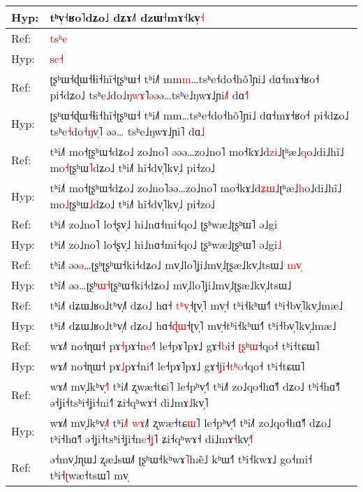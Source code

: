 \documentclass[10pt]{article}
\DeclareRobustCommand{\hl}[1]{{\textcolor{red}{#1}}}
\begin{document}
\begin{longtable}{ll}
Hyp: & tʰv̩˧ʁo˥dʑo˩ dʑɤ˩˥ dzɯ˧mɤ˧kv̩\hl{˧} \\ 
\midrule 
Ref: & \hl{t}s\hl{ʰ}\hl{e} \\ 
Hyp: & s\hl{e}\hl{˧} \\ 
\midrule 
Ref: & ʈʂʰɯ˧ɖɯ˧ɬi˧hĩ˧ʈʂʰɯ˧ tʰi˩˥ mm\hl{m}…tsʰe˧do˧hõ˥ɲi˩ dɑ˧mɤ˧ʁo˧ pi˧dʑo˩ tsʰe\hl{˩}do\hl{˩}ŋ\hl{w}\hl{ɤ}˥\hl{ə}əə…tsʰe˩ŋwɤ˩ɲi\hl{˩}˥ dɑ\hl{˧}\hl{˥} \\ 
Hyp: & ʈʂʰɯ˧ɖɯ˧ɬi˧hĩ˧ʈʂʰɯ˧ tʰi˩˥ mm…tsʰe˧do˧hõ˥ɲi˩ dɑ˧mɤ˧ʁo˧ pi˧dʑo˩ tsʰe\hl{˧}do\hl{˧}ŋ\hl{v}\hl{̩}˥\hl{ }əə…\hl{ }tsʰe˩ŋwɤ˩ɲi˥ dɑ\hl{˩} \\ 
\midrule 
Ref: & tʰi˩˥ mo˧ʈʂʰɯ˧dʑo˩ zo˩no˥\hl{ }\hl{ə}əə…zo˩no˥ mo˧kɤ˩d\hl{z}\hl{i}˩ʈʰæ˩\hl{q}o˩di˩hĩ˩ mo\hl{˧}ʈʂʰɯ\hl{˥}dʑo˩ tʰi˩˥ hĩ˧dv̩˥kv̩˩ pi˧zo˩ \\ 
Hyp: & tʰi˩˥ mo˧ʈʂʰɯ˧dʑo˩ zo˩no˥əə…zo˩no˥ mo˧kɤ˩d\hl{ʑ}\hl{ɯ}˩ʈʰæ˩\hl{h}o˩di˩hĩ˩ mo\hl{˩}ʈʂʰɯ\hl{˩}dʑo˩ tʰi˩˥ hĩ˧dv̩˥kv̩˩ pi˧zo˩ \\ 
\midrule 
Ref: & tʰi˩˥ zo˩no˥ lo˧ʂv̩˩ hi˩nɑ˧mi˧qo˩ ʈʂʰwæ˩ʈʂʰɯ˥ ə˩gi \\ 
Hyp: & tʰi˩˥ zo˩no˥ lo˧ʂv̩˩ hi˩nɑ˧mi˧qo˩ ʈʂʰwæ˩ʈʂʰɯ˥ ə˩gi\hl{˩} \\ 
\midrule 
Ref: & tʰi˩˥ əə\hl{ə}…ʈʂʰʈʂʰɯ˧ki˧dʑo˩ mv̩˩lo˥ʝi˩mv̩˩ʈʂæ˩kv̩˩tsɯ˩\hl{ }\hl{m}\hl{v}\hl{̩} \\ 
Hyp: & tʰi˩˥ əə…ʈʂʰ\hl{ɯ}\hl{˧}ʈʂʰɯ˧ki˧dʑo˩ mv̩˩lo˥ʝi˩mv̩˩ʈʂæ˩kv̩˩tsɯ˩ \\ 
\midrule 
Ref: & tʰi˩˥ dʑɯ˩ʁo˩tʰv̩˩˥ dʑo˩ hɑ˧\hl{ }\hl{t}\hl{ʰ}\hl{v}\hl{̩}˧ʈv̩˥ mv̩˧\hl{ }tʰi˧kʰɯ˧˥ tʰi˧bv̩˥kv̩˩mæ˩ \\ 
Hyp: & tʰi˩˥ dʑɯ˩ʁo˩tʰv̩˩˥ dʑo˩ hɑ˧\hl{ɖ}\hl{ɯ}˧ʈv̩˥ mv̩˧tʰi˧kʰɯ˧˥ tʰi˧bv̩˥kv̩˩mæ˩ \\ 
\midrule 
Ref: & wɤ˩˥ no˧ɳɯ˧ pɤ\hl{˧}pɤ˧n\hl{e}˧˥ le˧pɤ˥pɤ˩ gɤ˧\hl{b}i˧\hl{ }\hl{ʈ}\hl{ʂ}ʰ\hl{ɯ}˧qo˧ tʰi˧tɕɯ˥ \\ 
Hyp: & wɤ˩˥ no˧ɳɯ˧ pɤ\hl{˩}pɤ˧n\hl{i}˧˥ le˧pɤ˥pɤ˩ gɤ˧\hl{ʝ}i˧\hl{t}ʰ\hl{o}˧qo˧ tʰi˧tɕɯ˥ \\ 
\midrule 
Ref: & wɤ˩˥ mv̩˩kʰv̩\hl{˧}˥ tʰi˩˥ ʐwæ˧tɕ\hl{i}˥ le˧pʰv̩˧˥ tʰi˩˥ zo˩qo˧hɑ̃˧˥ dʑo˩ tʰi˧hɑ̃˧˥ ə˧ʝi˧tsʰi˧ʝi˧n\hl{i}˧˥ ʑi˧qʰwɤ˧ di˩mɤ\hl{˩}kv̩˥ \\ 
Hyp: & wɤ˩˥ mv̩˩kʰv̩\hl{˩}˥ tʰi\hl{˩}\hl{˥}\hl{ }\hl{w}\hl{ɤ}˩˥ ʐwæ˧tɕ\hl{ɯ}˥ le˧pʰv̩˧˥ tʰi˩˥ zo˩qo˧hɑ̃˧˥ dʑo˩ tʰi˧hɑ̃˧˥ ə˧ʝi˧tsʰi˧ʝi˧n\hl{e}˧\hl{ʝ}˥ ʑi˧qʰwɤ˧ di˩mɤ\hl{˧}kv̩\hl{˧}˥ \\ 
\midrule 
Ref: & ə˧mv̩˩ɳɯ˩ ʐæ˩sɯ˩˥ ʈʂʰɯ˧kʰwɤ\hl{˥}hæ̃˩ kʰɯ˧\hl{˥}\hl{ }tʰi˧kwɤ˩ go˧mi˧ tʰi˧\hl{ʈ}wæ˧tsɯ˥ mv̩ \\ 

\end{longtable}
\end{document}
